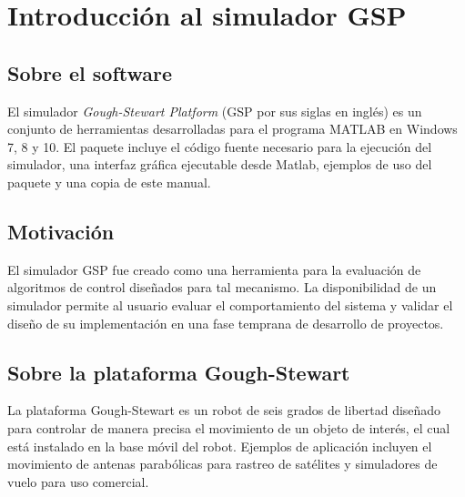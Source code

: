 \chapter{Introducción al simulador GSP}

\section{Sobre el software}
El simulador \emph{Gough-Stewart Platform} (GSP por sus siglas en inglés) es un 
conjunto de herramientas desarrolladas para el programa MATLAB en Windows 7, 8 y 10. El paquete incluye el código fuente necesario 
para la ejecución del simulador, una interfaz gráfica ejecutable desde Matlab, 
ejemplos de uso del paquete y una copia de este manual.

\section{Motivación}
El simulador GSP fue creado como una herramienta para la evaluación de 
algoritmos de control diseñados para tal mecanismo. La disponibilidad de un 
simulador permite al usuario evaluar el comportamiento del sistema y validar el 
diseño de su implementación en una fase temprana de desarrollo de proyectos.

\section{Sobre la plataforma Gough-Stewart}

La plataforma Gough-Stewart es un robot de seis grados de libertad diseñado para 
controlar de manera precisa el movimiento de un objeto de interés, el cual está 
instalado en la base móvil del robot. Ejemplos de aplicación incluyen el 
movimiento de antenas parabólicas para rastreo de satélites y
simuladores de vuelo para uso comercial.


